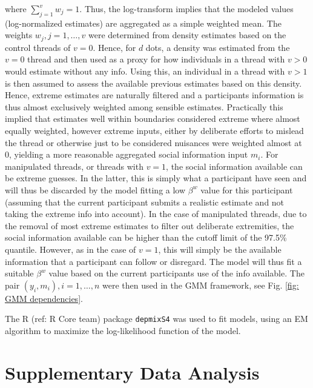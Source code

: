 \documentclass[9pt,a4paper,twocolumn,lineno]{article}
\begin{document}
where $\sum_{j=1}^v w_j = 1$. Thus, the log-transform implies that the modeled values (log-normalized estimates) are aggregated as a simple weighted mean. The weights $w_j, j=1,\dots,v$ were determined from density estimates based on the control threads of $v=0$. Hence, for $d$ dots, a density was estimated from the $v=0$ thread and then used as a proxy for how individuals in a thread with $v>0$ would estimate without any info. Using this, an individual in a thread with $v>1$ is then assumed to assess the available previous estimates based on this density. Hence, extreme estimates are naturally filtered and a participants information is thus almost exclusively weighted among sensible estimates. Practically this implied that estimates well within boundaries considered extreme where almost equally weighted, however extreme inputs, either by deliberate efforts to mislead the thread or otherwise just to be considered nuisances were weighted almost at 0, yielding a more reasonable aggregated social information input $m_i$. For manipulated threads, or threads with $v=1$, the social information available can be extreme guesses. In the latter, this is simply what a participant have seen and will thus be discarded by the model fitting a low $\beta^w$ value for this participant (assuming that the current participant submits a realistic estimate and not taking the extreme info into account). In the case of manipulated threads, due to the removal of most extreme estimates to filter out deliberate extremities, the social information available can be higher than the cutoff limit of the 97.5\% quantile. However, as in the case of $v=1$, this will simply be the available information that a participant can follow or disregard. The model will thus fit a suitable $\beta^w$ value based on the current participants use of the info available. The pair $(y_i,m_i), i=1,\dots,n$ were then used in the GMM framework, see Fig. \ref{fig: GMM dependencies}.

The R (ref: R Core team) package \texttt{depmixS4} was used to fit models, using an EM algorithm to maximize the log-likelihood function of the model. 

\section*{Supplementary Data Analysis}
\end{document}
